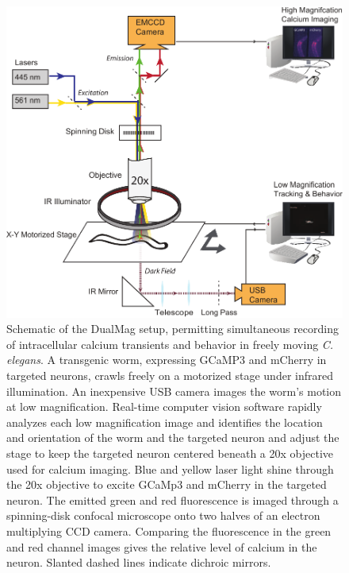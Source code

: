 \begin{figure} %
\includegraphics[width=\textwidth]{figures/omegaCalciumImagingSetup}
\caption[DualMag system apparatus.]{Schematic of the DualMag setup, permitting simultaneous recording of intracellular calcium transients and behavior in freely moving \textit{C. elegans}.  A transgenic worm, expressing GCaMP3 and mCherry in targeted neurons, crawls freely on a motorized stage under infrared illumination. An inexpensive USB camera images the worm's motion at low magnification. Real-time computer vision software rapidly analyzes each low magnification image and identifies the location and orientation of the worm and the targeted neuron and adjust the stage to keep the targeted neuron centered beneath a 20x objective used for calcium imaging.  Blue and yellow laser light shine through the 20x objective to excite GCaMp3 and mCherry in the targeted neuron. The emitted green and red fluorescence  is imaged through a spinning-disk confocal microscope onto two halves of an electron multiplying CCD camera.  Comparing the fluorescence in the green and red  channel images gives the relative level of calcium in the neuron. Slanted dashed lines indicate dichroic mirrors. \label{fig:omegaSchematic}}
\end{figure}







